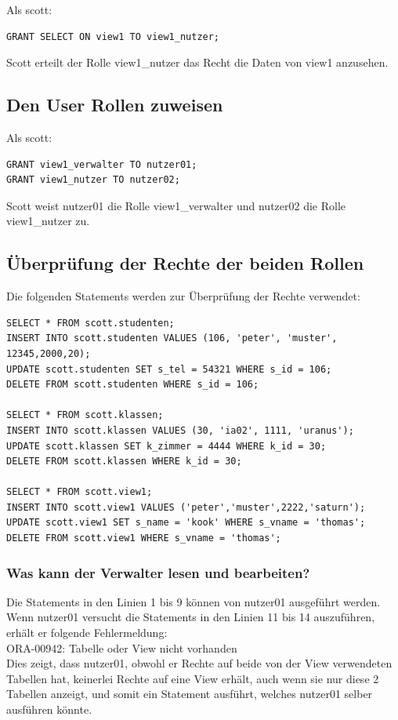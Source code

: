 \documentclass[10pt]{scrreprt}
\begin{document}
Als scott:
\begin{lstlisting}[style=sql]
GRANT SELECT ON view1 TO view1_nutzer;
\end{lstlisting}
Scott erteilt der Rolle view1\_nutzer das Recht die Daten von view1 anzusehen.

\subsection{Den User Rollen zuweisen}
Als scott:
\begin{lstlisting}[style=sql]
GRANT view1_verwalter TO nutzer01;
GRANT view1_nutzer TO nutzer02;
\end{lstlisting}
Scott weist nutzer01 die Rolle view1\_verwalter und nutzer02 die Rolle view1\_nutzer zu.

\subsection{Überprüfung der Rechte der beiden Rollen}
Die folgenden Statements werden zur Überprüfung der Rechte verwendet:
\begin{lstlisting}[style=sql]
SELECT * FROM scott.studenten;
INSERT INTO scott.studenten VALUES (106, 'peter', 'muster', 12345,2000,20);
UPDATE scott.studenten SET s_tel = 54321 WHERE s_id = 106;
DELETE FROM scott.studenten WHERE s_id = 106;

SELECT * FROM scott.klassen;
INSERT INTO scott.klassen VALUES (30, 'ia02', 1111, 'uranus');
UPDATE scott.klassen SET k_zimmer = 4444 WHERE k_id = 30;
DELETE FROM scott.klassen WHERE k_id = 30;

SELECT * FROM scott.view1;
INSERT INTO scott.view1 VALUES ('peter','muster',2222,'saturn');
UPDATE scott.view1 SET s_name = 'kook' WHERE s_vname = 'thomas';
DELETE FROM scott.view1 WHERE s_vname = 'thomas';
\end{lstlisting}
\subsubsection{Was kann der Verwalter lesen und bearbeiten?}
Die Statements in den Linien 1 bis 9 können von nutzer01 ausgeführt werden. Wenn nutzer01 versucht die Statements in den Linien 11 bis 14 auszuführen, erhält er folgende Fehlermeldung:\\
ORA-00942: Tabelle oder View nicht vorhanden\\
Dies zeigt, dass nutzer01, obwohl er Rechte auf beide von der View verwendeten Tabellen hat, keinerlei Rechte auf eine View erhält, auch wenn sie nur diese 2 Tabellen anzeigt, und somit ein Statement ausführt, welches nutzer01 selber ausführen könnte.
\end{document}
